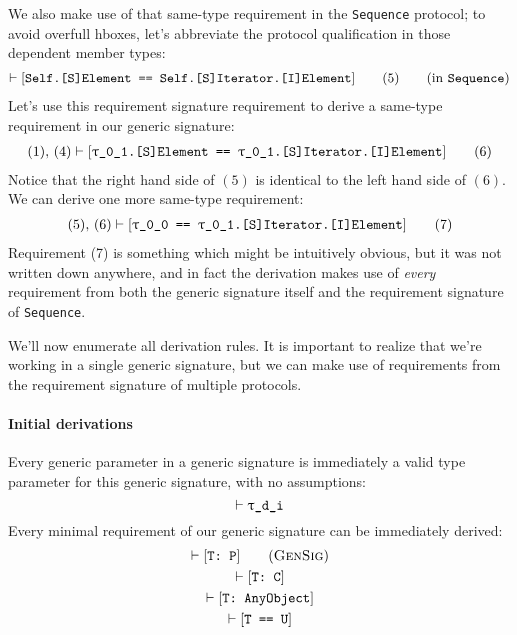\documentclass[../generics]{subfiles}
\begin{document}
We also make use of that same-type requirement in the \texttt{Sequence} protocol; to avoid overfull hboxes, let's abbreviate the protocol qualification in those dependent member types:
\begin{gather}
\vdash[\texttt{Self.[S]Element == Self.[S]Iterator.[I]Element}]\tag{5}\qquad\mbox{(in \texttt{Sequence})}
\end{gather}
Let's use this requirement signature requirement to derive a same-type requirement in our generic signature:
\begin{gather}
(1),\,(4)\vdash[\texttt{\texttt{$\uptau$\_0\_1}.[S]Element == \texttt{$\uptau$\_0\_1}.[S]Iterator.[I]Element}]\tag{6}
\end{gather}
Notice that the right hand side of $(5)$ is identical to the left hand side of $(6)$. We can derive one more same-type requirement:
\begin{gather}
(5),\,(6)\vdash[\texttt{\texttt{$\uptau$\_0\_0} == \texttt{$\uptau$\_0\_1}.[S]Iterator.[I]Element}]\tag{7}
\end{gather}
Requirement (7) is something which might be intuitively obvious, but it was not written down anywhere, and in fact the derivation makes use of \emph{every} requirement from both the generic signature itself and the requirement signature of \texttt{Sequence}.

We'll now enumerate all derivation rules. It is important to realize that we're working in a single generic signature, but we can make use of requirements from the requirement signature of multiple protocols.

\paragraph{Initial derivations}
Every generic parameter in a generic signature is immediately a valid type parameter for this generic signature, with no assumptions:
\[\vdash\texttt{$\uptau$\_d\_i}\]
Every minimal requirement of our generic signature can be immediately derived:
\begin{gather*}
\vdash\ConfReq{T}{P}\tag{\textsc{GenSig}}\\
\vdash\ConfReq{T}{C}\\
\vdash\ConfReq{T}{AnyObject}\\
\vdash\FormalReq{T == U}
\end{gather*}
\end{document}
